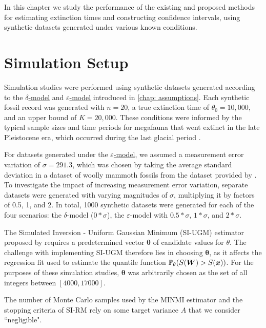 
In this chapter we study the performance of the existing and proposed methods for estimating extinction times and constructing confidence intervals, using synthetic datasets generated under various known conditions.

\section{Simulation Setup}

Simulation studies were performed using synthetic datasets generated according to the \hyperref[model: no-measurement-error]{$\delta$-model} and \hyperref[model: measurement-error]{$\varepsilon$-model} introduced in \autoref{chap: assumptions}. Each synthetic fossil record was generated with $n=20$, a true extinction time of $\theta_0 = 10,000$, and an upper bound of $K = 20,000$. These conditions were informed by the typical sample sizes and time periods for megafauna that went extinct in the late Pleistocene era, which occurred during the last glacial period \cite{Cooper2015}.

For datasets generated under the \hyperref[model: measurement-error]{$\varepsilon$-model}, we assumed a measurement error variation of $\sigma = 291.3$, which was chosen by taking the average standard deviation in a dataset of woolly mammoth fossils from the dataset provided by \citet{Cooper2015}. To investigate the impact of increasing measurement error variation, separate datasets were generated with varying magnitudes of $\sigma$, multiplying it by factors of 0.5, 1, and 2. In total, 1000 synthetic datasets were generated for each of the four scenarios: the $\delta$-model ($0*\sigma$), the $\varepsilon$-model with $0.5*\sigma$, $1*\sigma$, and $2*\sigma$. 

The Simulated Inversion - Uniform Gaussian Minimum (SI-UGM) estimator proposed by \citet{Huang2019} requires a predetermined vector $\bm{\theta}$ of candidate values for $\theta$. The challenge with implementing SI-UGM therefore lies in choosing $\bm{\theta}$, as it affects the regression fit used to estimate the quantile function $\mathbb{P}_\theta(S(\bm{W}) > S(\bm{x}))$. For the purposes of these simulation studies, $\bm{\theta}$ was arbitrarily chosen as the set of all integers between $[4000, 17000]$.

The number of Monte Carlo samples used by the MINMI estimator and the stopping criteria of SI-RM rely on some target variance $A$ that we consider ``negligible".

